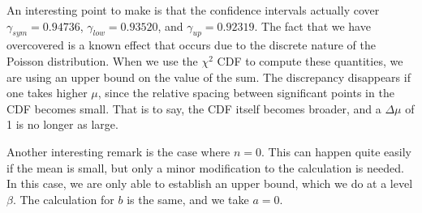 \documentclass[12pt]{article}
\begin{document}
An interesting point to make is that the confidence intervals actually cover $\gamma_{sym} = 0.94736$, $\gamma_{low} = 0.93520$, and $\gamma_{up} = 0.92319$.  The fact that we have overcovered is a known effect that occurs due to the discrete nature of the Poisson distribution.  When we use the $\chi^2$ CDF to compute these quantities, we are using an upper bound on the value of the sum.  The discrepancy disappears if one takes higher $\mu$, since the relative spacing between significant points in the CDF becomes small. That is to say, the CDF itself becomes broader, and a $\Delta \mu$ of 1 is no longer as large.

Another interesting remark is the case where $n = 0$.  This can happen quite easily if the mean is small, but only a minor modification to the calculation is needed.  In this case, we are only able to establish an upper bound, which we do at a level $\beta$.  The calculation for $b$ is the same, and we take $a = 0$.  



\end{document}
